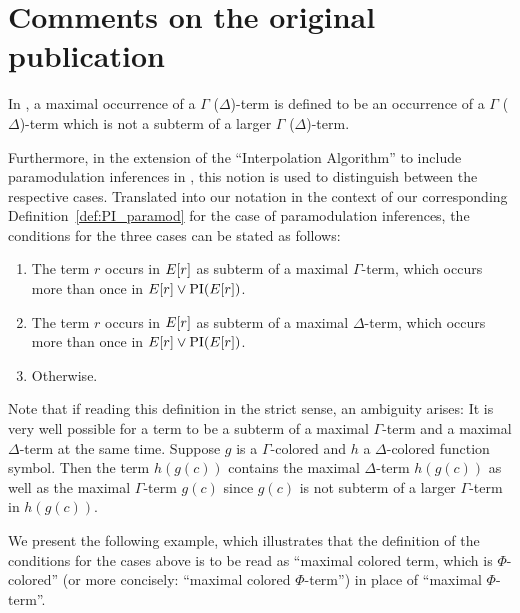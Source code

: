 \section{Comments on the original publication}
\label{sec:huang_commentary} 


In \cite[Definition 3]{Huang95}, a maximal occurrence of a $\Gamma$ ($\Delta$)-term is defined to be an occurrence of a $\Gamma$ ($\Delta$)-term which is not a subterm of a larger $\Gamma$ ($\Delta$)-term.

Furthermore, in the extension of the ``Interpolation Algorithm'' to include paramodulation inferences in \cite[p.~183]{Huang95}, this notion is used to distinguish between the respective cases.
Translated into our notation in the context of our corresponding Definition~\ref{def:PI_paramod} for the case of paramodulation inferences, the conditions for the three cases can be stated as follows:
\begin{enumerate}
	\item The term $r$ occurs in $E[r]$ as subterm of a maximal $\Gamma$-term, which occurs more than once in $E[r] \lor \operatorname{PI}(E[r])$.
		\label{case_1}
	\item The term $r$ occurs in $E[r]$ as subterm of a maximal $\Delta$-term, which occurs more than once in $E[r] \lor \operatorname{PI}(E[r])$.
	\item Otherwise.
\end{enumerate}

Note that if reading this definition in the strict sense, an ambiguity arises:
It is very well possible for a term to be a subterm of a maximal $\Gamma$-term and a maximal $\Delta$-term at the same time.
Suppose $g$ is a $\Gamma$-colored and $h$ a $\Delta$-colored function symbol.
Then the term $h(g(c))$ contains the maximal $\Delta$-term $h(g(c))$ as well as the maximal $\Gamma$-term $g(c)$ since $g(c)$ is not subterm of a larger $\Gamma$-term in\nolinebreak{} $h(g(c))$.

We present the following example, which illustrates that the definition of the conditions for the cases above is to be read as ``maximal colored term, which is $\Phi$-colored'' (or more concisely: ``maximal colored $\Phi$-term'') in place of ``maximal $\Phi$-term''.

